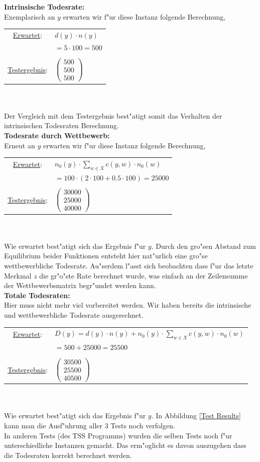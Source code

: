 \documentclass[11pt, a4paper, german]{article}
\theoremstyle{plain}
\newcommand{\trvec}[3]{\begin{pmatrix}#1\\#2\\#3\end{pmatrix}}
\begin{document}
	\textbf{Intrinsische Todesrate:}\\
	Exemplarisch an $ y $ erwarten wir f"ur diese Instanz folgende Berechnung,\\
	\renewcommand{\arraystretch}{1.2}
	\begin{tabular}{c l}
		\underline{Erwartet}: 		& $ d(y) \cdot n(y)  $\\
						& $ = 5 \cdot 100 = 500 $ \\\\
		\underline{Testergebnis}: 	& $ \trvec{500}{500}{500} $
	\end{tabular}\\\\
	Der Vergleich mit dem Testergebnis best"atigt somit das Verhalten der intrinsischen Todesraten Berechnung.\\
	
	\textbf{Todesrate durch Wettbewerb:}\\
	Erneut an $ y $ erwarten wir f"ur diese Instanz folgende Berechnung,\\
	
	\begin{tabular}{c l}
		\underline{Erwartet}: 		& $ n_0(y) \cdot \sum_{w \in X} c(y,w) \cdot n_0(w) $\\
						& $ = 100 \cdot ( 2 \cdot 100 + 0.5 \cdot 100 ) = 25000 $\\\\
		\underline{Testergebnis}: 	& $ \trvec{30000}{25000}{40000} $
	\end{tabular}\\\\
	Wie erwartet best"atigt sich das Ergebnis f"ur $ y $. Durch den gro"sen Abstand zum Equilibrium beider Funktionen entsteht hier nat"urlich eine gro"se wettbewerbliche Todesrate. Au"serdem l"asst sich beobachten dass f"ur das letzte Merkmal $ z $ die gr"o"ste Rate berechnet wurde, was einfach an der Zeilensumme der Wettbewerbsmatrix begr"undet werden kann.\\
	
	\textbf{Totale Todesraten:}\\
	Hier muss nicht mehr viel vorbereitet werden. Wir haben bereits die intrinsische und wettbewerbliche Todesrate ausgerechnet. \\
	
	\begin{tabular}{c l}
		\underline{Erwartet}: 		& $ D(y) =  d(y) \cdot n(y) + n_0(y) \cdot \sum_{w \in X} c(y,w) \cdot n_0(w) $\\
						& $ = 500 + 25000 = 25500$\\\\
		\underline{Testergebnis}: 	& $ \trvec{30500}{25500}{40500} $
	\end{tabular}\\\\
	Wie erwartet best"atigt sich das Ergebnis f"ur $ y $. In Abbildung \ref{Test Results} kann man die Ausf"uhrung aller 3 Tests noch verfolgen.\\
	In anderen Tests (des TSS Programms) wurden die selben Tests noch f"ur unterschiedliche Instanzen gemacht. Das erm"oglicht es davon auszugehen dass die Todesraten korrekt berechnet werden.\\
	
\end{document}
